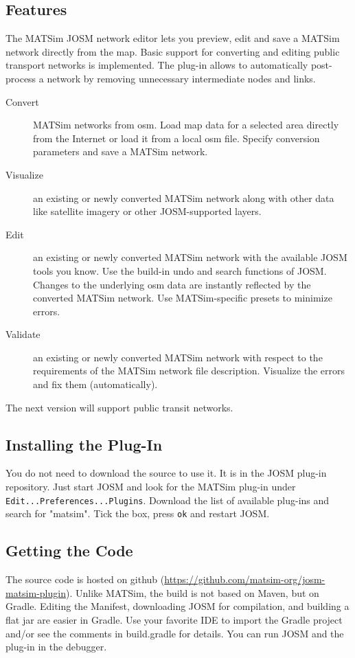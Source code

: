 \subsection{Features}
The MATSim JOSM network editor lets you preview, edit and save a MATSim network directly from the map. Basic support for converting and editing public transport networks is implemented. The plug-in allows to automatically post-process a network by removing unnecessary intermediate nodes and links.
\begin{description}
\item[Convert] MATSim networks from \gls{osm}. Load map data for a selected area directly from the Internet or load it from a local osm file. Specify conversion parameters and save a MATSim network.
\item[Visualize] an existing or newly converted MATSim network along with other data like satellite imagery or other JOSM-supported layers.
\item[Edit] an existing or newly converted MATSim network with the available JOSM tools you know. Use the build-in undo and search functions of JOSM. Changes to the underlying \gls{osm} data are instantly reflected by the converted MATSim network. Use MATSim-specific presets to minimize errors.
\item[Validate] an existing or newly converted MATSim network with respect to the requirements of the MATSim network file description. Visualize the errors and fix them (automatically). 
\end{description}
The next version will support public transit networks.

\subsection{Installing the Plug-In}
You do not need to download the source to use it. It is in the JOSM plug-in repository. Just start JOSM and look for the MATSim plug-in under \lstinline|Edit...Preferences...Plugins|. Download the list of available plug-ins and search for "matsim". Tick the box, press \lstinline|ok| and restart JOSM.

\subsection{Getting the Code}
The source code is hosted on github (\url{https://github.com/matsim-org/josm-matsim-plugin}). Unlike MATSim, the build is not based on Maven, but on Gradle. Editing the Manifest, downloading JOSM for compilation, and building a flat jar are easier in Gradle. Use your favorite IDE to import the Gradle project and/or see the comments in build.gradle for details. You can run JOSM and the plug-in in the debugger.
 
